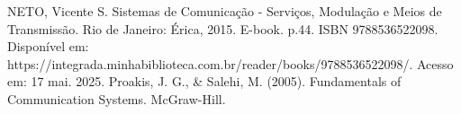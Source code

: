 \begin{thebibliography}{00}
 NETO, Vicente S. Sistemas de Comunicação - Serviços, Modulação e Meios de Transmissão. Rio de Janeiro: Érica, 2015. E-book. p.44. ISBN 9788536522098. Disponível em: https://integrada.minhabiblioteca.com.br/reader/books/9788536522098/. Acesso em: 17 mai. 2025.
 Proakis, J. G., \& Salehi, M. (2005). Fundamentals of Communication Systems. McGraw-Hill.
\end{thebibliography}